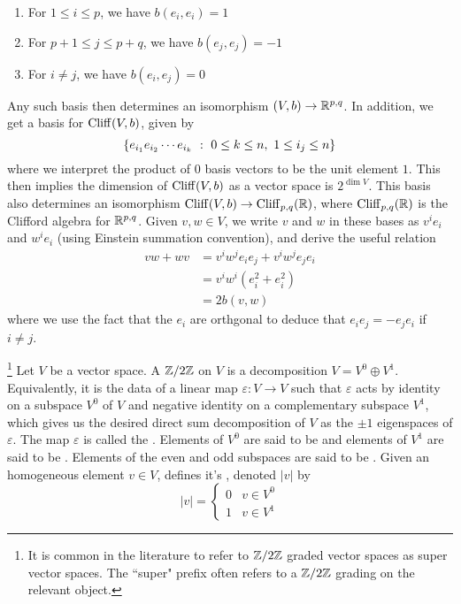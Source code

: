 %
\begin{enumerate}
  \item For $1 \leq i \leq p$, we have $b(e_i,e_i) = 1$
  \item For $p+1 \leq j \leq p+q$, we have $b(e_j,e_j) = -1$
  \item For $i \neq j$, we have $b(e_i,e_j) = 0$
\end{enumerate}
%
Any such basis then determines an isomorphism $(V,b) \to \mathbb{R}^{p,q}$.
In addition, we get a basis for $\operatorname{Cliff}(V,b)$, given by
\[
\left\lbrace e_{i_1}e_{i_2}\cdots e_{i_k}~:~ 0 \leq k \leq n, ~ 1 \leq i_j \leq n \right\rbrace
\]
where we interpret the product of $0$ basis vectors to be the unit element $1$.
This then implies the dimension of $\operatorname{Cliff}(V,b)$ as a vector space is
$2^{\dim V}$. This basis also determines an isomorphism
$\operatorname{Cliff}(V,b) \to \operatorname{Cliff}_{p,q}(\mathbb{R})$, where $\operatorname{Cliff}_{p,q}(\mathbb{R})$ is the Clifford
algebra for $\mathbb{R}^{p,q}$. Given $v,w \in V$, we write $v$ and $w$ in these
bases as $v^ie_i$ and $w^ie_i$ (using Einstein summation convention),
and derive the useful relation
%
\begin{align*}
vw + wv &= v^iw^je_ie_j + v^iw^je_je_i \\
&= v^iw^i(e_i^2 + e_i^2) \\
&= 2b(v,w)
\end{align*}
where we use the fact that the $e_i$ are orthgonal to deduce that $e_ie_j = -e_je_i$
if $i \neq j$.
%
\begin{defn}\footnote{It is common in the literature to refer to $\mathbb{Z}/2\mathbb{Z}$
graded vector spaces as super vector spaces. The ``super" prefix often refers
to a $\mathbb{Z}/2\mathbb{Z}$ grading on the relevant object.}
Let $V$ be a vector space. A $\mathbb{Z} /2\mathbb{Z}$  on $V$ is a decomposition
$V = V^0 \oplus V^1$. Equivalently, it is the data of a linear map
$\varepsilon : V \to V$ such that $\varepsilon$ acts by identity on a subspace $V^0$
of $V$ and negative identity on a complementary subspace $V^1$, which gives us the
desired direct sum decomposition of $V$ as the $\pm 1$ eigenspaces of $\varepsilon$.
The map $\varepsilon$ is called the . Elements of $V^0$
are said to be  and elements of $V^1$ are said to be . Elements
of the even and odd subspaces are said to be . Given an homogeneous
element $v \in V$, defines it's , denoted $|v|$ by
\[
|v| = \begin{cases}
0 & v \in V^0 \\
1 & v \in V^1
\end{cases}
\]
\end{defn}
